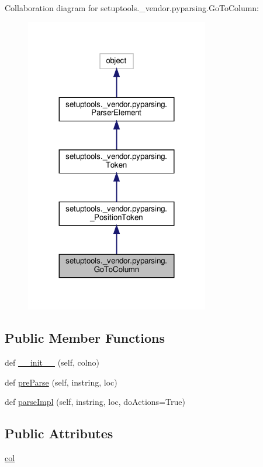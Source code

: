 Collaboration diagram for setuptools.\+\_\+vendor.\+pyparsing.\+Go\+To\+Column\+:
\nopagebreak
\begin{figure}[H]
\begin{center}
\leavevmode
\includegraphics[width=227pt]{classsetuptools_1_1__vendor_1_1pyparsing_1_1GoToColumn__coll__graph}
\end{center}
\end{figure}
\subsection*{Public Member Functions}
\begin{DoxyCompactItemize}
\item 
def \hyperlink{classsetuptools_1_1__vendor_1_1pyparsing_1_1GoToColumn_a008f076cf04ec72516511c95102b2be7}{\+\_\+\+\_\+init\+\_\+\+\_\+} (self, colno)
\item 
def \hyperlink{classsetuptools_1_1__vendor_1_1pyparsing_1_1GoToColumn_aaad80f703431014740cde9a81e8c429b}{pre\+Parse} (self, instring, loc)
\item 
def \hyperlink{classsetuptools_1_1__vendor_1_1pyparsing_1_1GoToColumn_ad0313c1890945d712e32732ade4de837}{parse\+Impl} (self, instring, loc, do\+Actions=True)
\end{DoxyCompactItemize}
\subsection*{Public Attributes}
\begin{DoxyCompactItemize}
\item 
\hyperlink{classsetuptools_1_1__vendor_1_1pyparsing_1_1GoToColumn_a206e08317a2119283a789c01645505d9}{col}
\end{DoxyCompactItemize}
